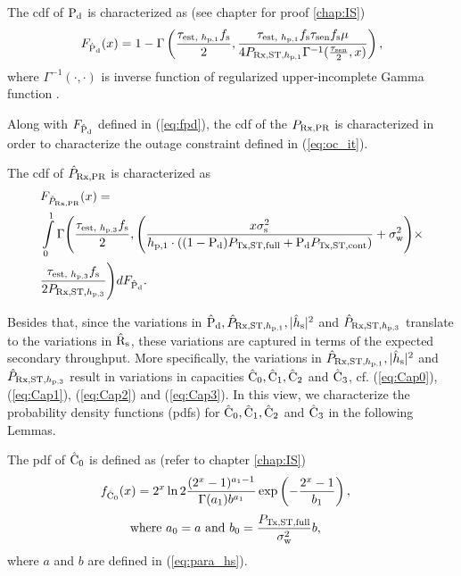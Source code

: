 \begin{lemma} \label{lm:lem1}
\normalfont
The cdf of $\text{P}_{\text{d}}$ is characterized as (see chapter for proof \ref{chap:IS}) 
\begin{align}
F_{\hat{\text{P}}_{\text{d}}}(x) = 1 - \Gamma \left(\frac{\tau_{\text{est, $h_{\text{p,1}}$}} f_{\text{s}}}{2}, \frac{\tau_{\text{est, $h_{\text{p,1}}$}} f_{\text{s}} \tau_{\text{sen}} f_{\text{s}} \mu}{4 P_{\text{Rx,ST,$h_{\text{p,1}}$}} \Gamma^{-1}(\frac{\tau_{\text{sen}}}{2}, x) } \right), 
\label{eq:fpd}
\end{align}
where $\Gamma^{-1}(\cdot, \cdot)$ is inverse function of regularized upper-incomplete Gamma function \cite{grad}.
\end{lemma}
Along with $F_{\hat{\text{P}}_{\text{d}}}$ defined in (\ref{eq:fpd}), the cdf of the $P_{\text{Rx,PR}}$ is characterized in order to characterize the outage constraint defined in (\ref{eq:oc_it}). 
\begin{lemma} \label{lm:lem2}
\normalfont
The cdf of $\hat{P}_{\text{Rx,PR}}$ is characterized as 
\begin{align}
&F_{\hat{P}_{\text{Rx,PR}}} (x) = \nonumber \\ 
&\int\limits_0^1 \Gamma \Bigg(\frac{\tau_{\text{est, $h_{\text{p,3}}$}} f_{\text{s}}}{2} , \Bigg( \frac{x \sigma^2_{\text{s}}}{h_{\text{p,1}} \cdot ((1 - \text{P}_{\text{d}}) P_{\text{Tx,ST,full}} + \text{P}_{\text{d}} P_{\text{Tx,ST,cont}})} + \sigma^2_{\text{w}}  \Bigg) \times \nonumber \\ 
&\frac{\tau_{\text{est, $h_{\text{p,3}}$}} f_{\text{s}}}{2 P_{\text{Rx,ST,$h_{\text{p,3}}$}}}  \Bigg) dF_{\hat{\text{P}}_{\text{d}}}. 
\label{eq:fprcvdpr}
\end{align}
\end{lemma}

Besides that, since the variations in $\hat{\text{P}}_{\text{d}}, \hat{P}_{\text{Rx,ST,$h_{\text{p,1}}$}}, |\hat{h}_{\text{s}}|^2$ and $\hat{P}_{\text{Rx,ST,$h_{\text{p,3}}$}}$ translate to the variations in $\hat{\text{{R}}}_{\text{s}}$, these variations are captured in terms of the expected secondary throughput. More specifically, the variations in $\hat{P}_{\text{Rx,ST,$h_{\text{p,1}}$}}, |\hat{h}_{\text{s}}|^2$ and $\hat{P}_{\text{Rx,ST,$h_{\text{p,3}}$}}$ result in variations in capacities $\hat{\text{C}}_{\text{0}}, \hat{\text{C}}_{\text{1}}, \hat{\text{C}}_{\text{2}}$ and $\hat{\text{C}}_{\text{3}}$, cf. (\ref{eq:Cap0}), (\ref{eq:Cap1}), (\ref{eq:Cap2}) and (\ref{eq:Cap3}). In this view, we characterize the probability density functions (pdfs) for $\hat{\text{C}}_{\text{0}}, \hat{\text{C}}_{\text{1}}, \hat{\text{C}}_{\text{2}}$ and $\hat{\text{C}}_{\text{3}}$ in the following Lemmas.
\begin{lemma} \label{lm:lem3}
\normalfont
The pdf of $\hat{\text{C}}_{\text{0}}$ is defined as (refer to chapter \ref{chap:IS}) 
\begin{align}
f_{\hat{\text{C}}_{\text{0}}}(x) &= 2^x \ln 2 \frac{(2^x - 1)^{a_1 - 1}}{\Gamma(a_1) b^{a_1}} \exp\left(-\frac{2^x - 1}{b_1}\right),  \label{eq:den_C0}
\end{align}
\begin{align}
\text{where  } a_0 = a &\text{ and } b_0 = \frac{P_{\text{Tx,ST,full}}}{\sigma^2_{\text{w}}} b,  \label{eq:den_C0_para} 
\end{align}
where $a$ and $b$ are defined in (\ref{eq:para_hs}).
\end{lemma}

